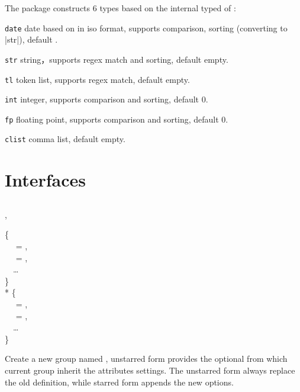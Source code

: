 \documentclass[full]{l3doc}
\begin{document}
\begin{documentation}
The package constructs 6 types based on the internal typed of :
\begin{Description}
  \item[\texttt{date}]
    date based on  in iso format, supports comparison,
    sorting (converting to |str|), default .
  \item[\texttt{str}]
    string，supports regex match and sorting, default empty.
  \item[\texttt{tl}]
    token list, supports regex match, default empty.
  \item[\texttt{int}]
    integer, supports comparison and sorting, default 0.
  \item[\texttt{fp}]
    floating point, supports comparison and sorting, default 0.
  \item[\texttt{clist}]
    comma list, default empty.
\end{Description}

\section{Interfaces}

\subsection{}

\begin{function}{\rvNewGroup, \rvNewGroup*}
  \begin{syntax}
       \{ \\
    ~~ = , \\
    ~~ = , \\
    ~~\ldots{} \\
    \} \\
    *  \{ \\
    ~~ = , \\
    ~~ = , \\
    ~~\ldots{} \\
    \} \\
  \end{syntax}

\end{function}

Create a new group named , unstarred form provides the optional
 from which current group inherit the attributes settings.
The unstarred form always replace the old definition, while starred form
appends the new options.


\end{documentation}
\end{document}
